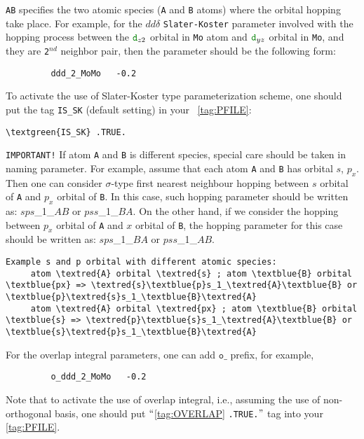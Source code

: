 \documentclass[a4paper,12pt]{scrartcl}
\makeatletter
\def\namedlabel#1#2{\begingroup
    #2%
    \def\@currentlabel{#2}%
    \phantomsection\label{#1}\endgroup
}
\newcommand{\textred}[1]{\textcolor{red!85!white}{\texttt{#1}}}
\newcommand{\textblue}[1]{\textcolor{blue!85!white}{\texttt{#1}}}
\newcommand{\textgreen}[1]{\textcolor{green!50!black}{\texttt{#1}}}
\newcommand{\textpink}[1]{\textcolor{red!60!yellow}{\texttt{#1}}}
\makeatother
\begin{document}
\begin{description}
		\textred{A}\textblue{B} specifies the two atomic species (\textred{A} and \textblue{B} atoms) 
		where the orbital hopping take place. 
		For example, for the $dd\delta$ \texttt{Slater-Koster} parameter involved with 
		the hopping process between the $\textgreen{d}_{z2}$ orbital in \textred{Mo} atom 
		and $\textgreen{d}_{yz}$ orbital in \textblue{Mo}, 
		and they are \textpink{2$^{nd}$} neighbor pair, then the parameter should be the following form:
        \begin{verbatim}
         ddd_2_MoMo   -0.2
        \end{verbatim}
   
   		To activate the use of Slater-Koster type parameterization scheme,
		 one should put the tag \namedlabel{tag:IS_SK}{\textblue{IS\_SK}} (default setting) in your ~\ref{tag:PFILE}:
		\begin{Verbatim}[commandchars=\\\{\}]
	 \textgreen{IS_SK} .TRUE.
		\end{Verbatim}
     
        \texttt{IMPORTANT!} If atom \textred{A} and \textblue{B} is different species, special care should be taken in naming parameter.
        For example, assume that each atom \textred{A} and \textblue{B} has orbital $s$, $p_x$. 
        Then one can consider $\sigma$-type first nearest neighbour hopping between $s$ orbital of \textred{A} and $p_x$ orbital of \textblue{B}.
        In this case, such hopping parameter should be written as: $sps$\_1\_$AB$ or $pss$\_1\_$BA$.
        On the other hand, if we consider the hopping between $p_x$ orbital of \textred{A} and $x$ orbital of \textblue{B}, the hopping parameter for this case should be written as: $sps$\_1\_$BA$ or $pss$\_1\_$AB$.

        \begin{Verbatim}[commandchars=\\\{\}]
     Example s and p orbital with different atomic species:
     atom \textred{A} orbital \textred{s} ; atom \textblue{B} orbital \textblue{px} => \textred{s}\textblue{p}s_1_\textred{A}\textblue{B} or \textblue{p}\textred{s}s_1_\textblue{B}\textred{A} 
     atom \textred{A} orbital \textred{px} ; atom \textblue{B} orbital \textblue{s} => \textred{p}\textblue{s}s_1_\textred{A}\textblue{B} or \textblue{s}\textred{p}s_1_\textblue{B}\textred{A} 
        \end{Verbatim}
       


         For the overlap integral parameters, one can add $\texttt{o\_}$ prefix, for example,
        \begin{verbatim}
         o_ddd_2_MoMo   -0.2
        \end{verbatim}
         Note that to activate the use of overlap integral, i.e., assuming the use of non-orthogonal basis, 
         one should put $``$\ref{tag:OVERLAP} \texttt{.TRUE.}$"$ tag into your \ref{tag:PFILE}.
        

\end{description}
\end{document}
